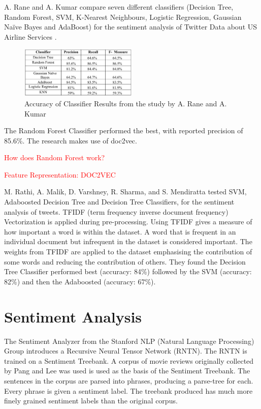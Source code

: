 A. Rane and A. Kumar compare seven different classifiers (Decision Tree, Random Forest, SVM, K-Nearest Neighbours, Logistic Regression, Gaussian Naïve Bayes and AdaBoost) for the sentiment analysis of Twitter Data about US Airline Services \cite{Rane2018}. 
\begin{figure}
    \centering
    \includegraphics[width=0.5\textwidth]{literature_review/arane_classifier_results.PNG}
    \caption{Accuracy of Classifier Results from the study by A. Rane and A. Kumar \cite{Rane2018}}
\end{figure}
The Random Forest Classifier performed the best, with reported precision of 85.6\%. The research makes use of doc2vec.

\textcolor{red}{How does Random Forest work?}

\textcolor{red}{Feature Representation: DOC2VEC}

M. Rathi, A. Malik, D. Varshney, R. Sharma, and S. Mendiratta \cite{Raithi2018} tested SVM, Adaboosted Decision Tree and Decision Tree Classifiers, for the sentiment analysis of tweets. TFIDF (term frequency inverse document frequency) Vectorization is applied during pre-processing. Using TFIDF gives a measure of how important a word is within the dataset. A word that is frequent in an individual document but infrequent in the dataset is considered important. The weights from TFIDF are applied to the dataset emphasising the contribution of some words and reducing the contribution of others. They found the Decision Tree Classifier performed best  (accuracy: 84\%) followed by the SVM (accuracy: 82\%) and then the Adaboosted (accuracy: 67\%). 



\section{Sentiment Analysis}

The Sentiment Analyzer from the Stanford NLP (Natural Language Processing) Group \cite{stanfordSentiment2013} introduces a Recursive Neural Tensor Network (RNTN). The RNTN is trained on a Sentiment Treebank. A corpus of movie reviews originally collected by Pang and Lee was used \cite{panglee2004} is used as the basis of the Sentiment Treebank. The sentences in the corpus are parsed into phrases, producing a parse-tree for each. Every phrase is given a sentiment label. The treebank produced has much more finely grained sentiment labels than the original corpus.

